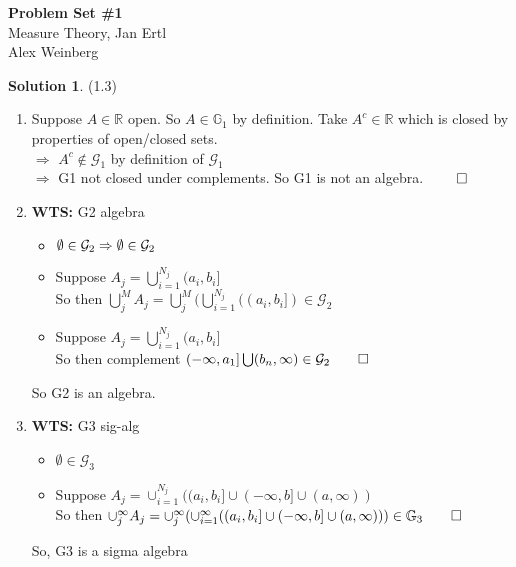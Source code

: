 \documentclass[letterpaper,12pt]{article}
\theoremstyle{definition}
\newtheorem{solution}[theorem]{Solution}
\begin{document}
\begin{flushleft}
  \textbf{\large{Problem Set \#1}} \\
  Measure Theory, Jan Ertl \\
  Alex Weinberg
\end{flushleft}

\vspace{5mm}

\begin{solution}(1.3)
  \begin{enumerate}
  \item
  Suppose $A \in \mathbb{R} $ open. So $A \in \mathbb{G}_1$ by definition. Take $A^c \in \mathbb{R}$ which is closed by properties of open/closed sets. \\
  $\Rightarrow$ $A^c \not \in \mathcal{G}_1$ by definition of $\mathcal{G}_1$ \\
  $\Rightarrow$ G1 not closed under complements. So G1 is not an algebra. $\qed$

  \item \textbf{WTS:} G2 algebra
  \begin{itemize}
  \item $\emptyset \in \mathcal{G}_2 \\
  \Rightarrow \emptyset \in \mathcal{G}_2 $
  \item Suppose $A_j = \bigcup_{i=1}^{N_j} (a_i,b_i] $ \\
  So then $\bigcup_j^M A_j = \bigcup_j^M (\bigcup_{i=1}^{N_j} ((a_i,b_i]) \in \mathcal{G}_2$
  \item Suppose $A_j = \bigcup_{i=1}^{N_j} (a_i,b_i] $ \\
  So then complement $(-\infty, a_1] \bigcup (b_n, \infty) \in \mathcal{G}_2 \qed$
  \end{itemize}
  So G2 is an algebra.

  \item \textbf{WTS:} G3 sig-alg
  \begin{itemize}
    \item $\emptyset \in \mathcal{G}_3$
    \item Suppose $A_j = \cup_{i=1}^{N_j} ((a_i,b_i] \cup (-\infty,b] \cup (a,\infty))$ \\
    So then $\cup_j^\infty A_j = \cup_j^\infty (\cup_{i=1}^{\infty} ((a_i,b_i] \cup (-\infty,b] \cup (a,\infty))) \in \mathbb{G}_3 \qed$
  \end{itemize}
  So, G3 is a sigma algebra
  \end{enumerate}
\end{solution}
\end{document}
